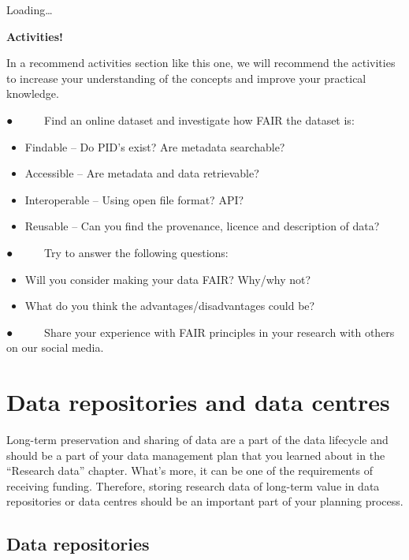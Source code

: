 \documentclass[
]{book}
\providecommand{\tightlist}{%
  \setlength{\itemsep}{0pt}\setlength{\parskip}{0pt}}
\begin{document}
Loading\ldots{}

\textbf{Activities!}

In a recommend activities section like this one, we will recommend the activities to increase your understanding of the concepts and improve your practical knowledge.

● ~ ~ ~ Find an online dataset and investigate how FAIR the dataset is:

\begin{itemize}
\tightlist
\item
  Findable -- Do PID's exist? Are metadata searchable?
\item
  Accessible -- Are metadata and data retrievable?
\item
  Interoperable -- Using open file format? API?
\item
  Reusable -- Can you find the provenance, licence and description of data?
\end{itemize}

● ~ ~ ~ Try to answer the following questions:

\begin{itemize}
\tightlist
\item
  Will you consider making your data FAIR? Why/why not?
\item
  What do you think the advantages/disadvantages could be?
\end{itemize}

● ~ ~ ~ Share your experience with FAIR principles in your research with others on our social media.

\hypertarget{data-repositories-and-data-centres}{%
\chapter{\texorpdfstring{\textbf{Data repositories and data centres}}{Data repositories and data centres}}\label{data-repositories-and-data-centres}}

Long-term preservation and sharing of data are a part of the data lifecycle and should be a part of your data management plan that you learned about in the ``Research data'' chapter. What's more, it can be one of the requirements of receiving funding. Therefore, storing research data of long-term value in data repositories or data centres should be an important part of your planning process.

\hypertarget{data-repositories}{%
\section{\texorpdfstring{\textbf{Data repositories}}{Data repositories}}\label{data-repositories}}
\end{document}
